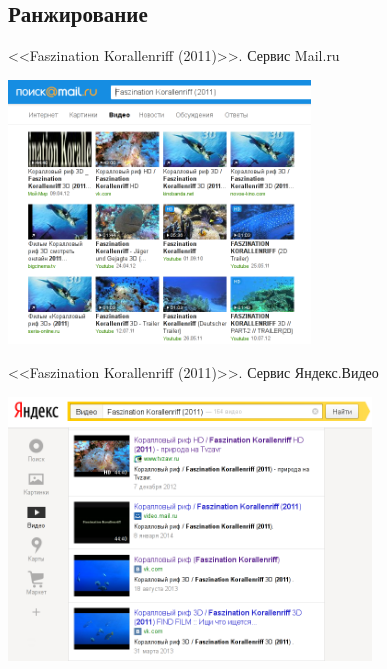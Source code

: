 \subsection{Ранжирование}

\begin{frame}{<<Faszination Korallenriff (2011)>>. Сервис Mail.ru}
    \begin{center}
        \includegraphics[height=7cm]{img/video/video-reranking-mailru.png}
    \end{center}
\end{frame}


\begin{frame}{<<Faszination Korallenriff (2011)>>. Сервис Яндекс.Видео}
    \begin{center}
        \includegraphics[height=7cm]{img/video/video-reranking-yandex.png}
    \end{center}
\end{frame}


